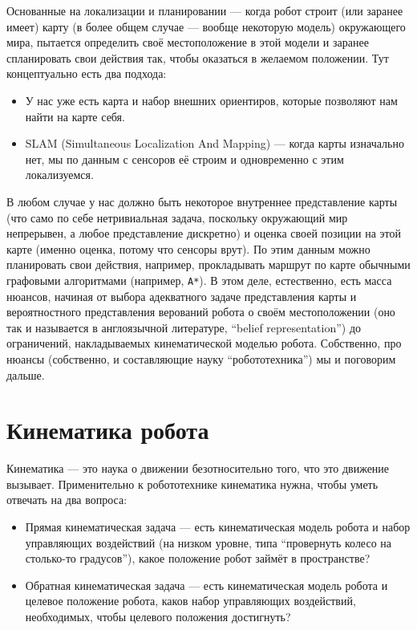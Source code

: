 \documentclass{../../text-style}
\begin{document}
Основанные на локализации и планировании --- когда робот строит (или заранее имеет) карту (в более общем случае --- вообще некоторую модель) окружающего мира, пытается определить своё местоположение в этой модели и заранее спланировать свои действия так, чтобы оказаться в желаемом положении.
Тут концептуально есть два подхода:

\begin{itemize}
    \item У нас уже есть карта и набор внешних ориентиров, которые позволяют нам найти на карте себя.
    \item SLAM (Simultaneous Localization And Mapping) --- когда карты изначально нет, мы по данным с сенсоров её строим и одновременно с этим локализуемся.
\end{itemize}

В любом случае у нас должно быть некоторое внутреннее представление карты (что само по себе нетривиальная задача, поскольку окружающий мир непрерывен, а любое представление дискретно) и оценка своей позиции на этой карте (именно оценка, потому что сенсоры врут).
По этим данным можно планировать свои действия, например, прокладывать маршрут по карте обычными графовыми алгоритмами (например, \texttt{A*}).
В этом деле, естественно, есть масса нюансов, начиная от выбора адекватного задаче представления карты и вероятностного представления верований робота о своём местоположении (оно так и называется в англоязычной литературе, \foreignquote{english}{belief representation}) до ограничений, накладываемых кинематической моделью робота.
Собственно, про нюансы (собственно, и составляющие науку \enquote{робототехника}) мы и поговорим дальше.

\section{Кинематика робота}

Кинематика --- это наука о движении безотносительно того, что это движение вызывает. Применительно к робототехнике кинематика нужна, чтобы уметь отвечать на два вопроса:

\begin{itemize}
    \item Прямая кинематическая задача --- есть кинематическая модель робота и набор управляющих воздействий (на низком уровне, типа \enquote{провернуть колесо на столько-то градусов}), какое положение робот займёт в пространстве?
    \item Обратная кинематическая задача --- есть кинематическая модель робота и целевое положение робота, каков набор управляющих воздействий, необходимых, чтобы целевого положения достигнуть?
\end{itemize}
\end{document}
